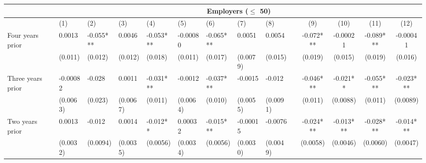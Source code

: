 \begin{tabular}{lccccrrrrrcccc}
\toprule
      & \multicolumn{13}{c}{Employers ($\leq$ 50)} \\
\midrule
      & \multicolumn{1}{l}{(1)} & \multicolumn{1}{l}{(2)} & \multicolumn{1}{l}{(3)} & \multicolumn{1}{l}{(4)} & \multicolumn{1}{l}{(5)} & \multicolumn{1}{l}{(6)} & \multicolumn{1}{l}{(7)} & \multicolumn{1}{l}{(8)} &       & (9)   & (10)  & (11)  & (12) \\
\midrule
\midrule
Four years prior & \multicolumn{1}{l}{0.0013} & \multicolumn{1}{l}{-0.055***} & \multicolumn{1}{l}{0.0046} & \multicolumn{1}{l}{-0.053***} & \multicolumn{1}{l}{-0.00080} & \multicolumn{1}{l}{-0.065***} & \multicolumn{1}{l}{0.0051} & \multicolumn{1}{l}{0.0054} &       & -0.072*** & -0.00021 & -0.089*** & -0.00041 \\
      & \multicolumn{1}{l}{(0.011)} & \multicolumn{1}{l}{(0.012)} & \multicolumn{1}{l}{(0.012)} & \multicolumn{1}{l}{(0.018)} & \multicolumn{1}{l}{(0.011)} & \multicolumn{1}{l}{(0.017)} & \multicolumn{1}{l}{(0.0079)} & \multicolumn{1}{l}{(0.015)} &       & (0.019) & (0.015) & (0.019) & (0.016) \\
Three years prior & \multicolumn{1}{l}{-0.00082} & \multicolumn{1}{l}{-0.028} & \multicolumn{1}{l}{0.0011} & \multicolumn{1}{l}{-0.031***} & \multicolumn{1}{l}{-0.0012} & \multicolumn{1}{l}{-0.037***} & \multicolumn{1}{l}{-0.0015} & \multicolumn{1}{l}{-0.012} &       & -0.046*** & -0.021** & -0.055*** & -0.023*** \\
      & \multicolumn{1}{l}{(0.0063)} & \multicolumn{1}{l}{(0.023)} & \multicolumn{1}{l}{(0.0067)} & \multicolumn{1}{l}{(0.011)} & \multicolumn{1}{l}{(0.0064)} & \multicolumn{1}{l}{(0.010)} & \multicolumn{1}{l}{(0.0055)} & \multicolumn{1}{l}{(0.0091)} &       & (0.011) & (0.0088) & (0.011) & (0.0089) \\
Two years prior & \multicolumn{1}{l}{0.0013} & \multicolumn{1}{l}{-0.012} & \multicolumn{1}{l}{0.0014} & \multicolumn{1}{l}{-0.012**} & \multicolumn{1}{l}{0.00032} & \multicolumn{1}{l}{-0.015***} & \multicolumn{1}{l}{-0.00015} & \multicolumn{1}{l}{-0.0076} &       & -0.024*** & -0.013*** & -0.028*** & -0.014*** \\
      & \multicolumn{1}{l}{(0.0032)} & \multicolumn{1}{l}{(0.0094)} & \multicolumn{1}{l}{(0.0035)} & \multicolumn{1}{l}{(0.0056)} & \multicolumn{1}{l}{(0.0034)} & \multicolumn{1}{l}{(0.0056)} & \multicolumn{1}{l}{(0.0030)} & \multicolumn{1}{l}{(0.0049)} &       & (0.0058) & (0.0046) & (0.0060) & (0.0047) \\

\end{tabular}

